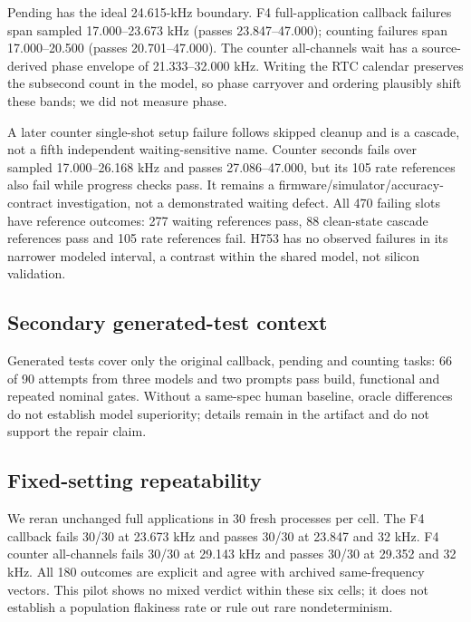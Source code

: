 \documentclass[sigconf,nonacm,balance=false]{acmart}
\begin{document}
\begin{table}[t]
\caption{Distinct case names per configuration. Run: ever runnable; Skip: always capability-skipped. Wait, Cascade and Rate are separate failure categories.}
\label{tab:expanded}\small\centering\setlength{\tabcolsep}{3pt}

\end{table}

Pending has the ideal 24.615-kHz boundary. F4 full-application callback failures span sampled 17.000--23.673 kHz (passes 23.847--47.000); counting failures span 17.000--20.500 (passes 20.701--47.000). The counter all-channels wait has a source-derived phase envelope of 21.333--32.000 kHz. Writing the RTC calendar preserves the subsecond count in the model, so phase carryover and ordering plausibly shift these bands; we did not measure phase.

A later counter single-shot setup failure follows skipped cleanup and is a cascade, not a fifth independent waiting-sensitive name. Counter seconds fails over sampled 17.000--26.168 kHz and passes 27.086--47.000, but its 105 rate references also fail while progress checks pass. It remains a firmware/simulator/accuracy-contract investigation, not a demonstrated waiting defect. All 470 failing slots have reference outcomes: 277 waiting references pass, 88 clean-state cascade references pass and 105 rate references fail. H753 has no observed failures in its narrower modeled interval, a contrast within the shared model, not silicon validation.

\subsection{Secondary generated-test context}
Generated tests cover only the original callback, pending and counting tasks: 66 of 90 attempts from three models and two prompts pass build, functional and repeated nominal gates. Without a same-spec human baseline, oracle differences do not establish model superiority; details remain in the artifact and do not support the repair claim.

\subsection{Fixed-setting repeatability}\label{sec:repeat} We reran unchanged full applications in 30 fresh processes per cell. The F4 callback fails 30/30 at 23.673 kHz and passes 30/30 at 23.847 and 32 kHz. F4 counter all-channels fails 30/30 at 29.143 kHz and passes 30/30 at 29.352 and 32 kHz. All 180 outcomes are explicit and agree with archived same-frequency vectors. This pilot shows no mixed verdict within these six cells; it does not establish a population flakiness rate or rule out rare nondeterminism.
\end{document}
